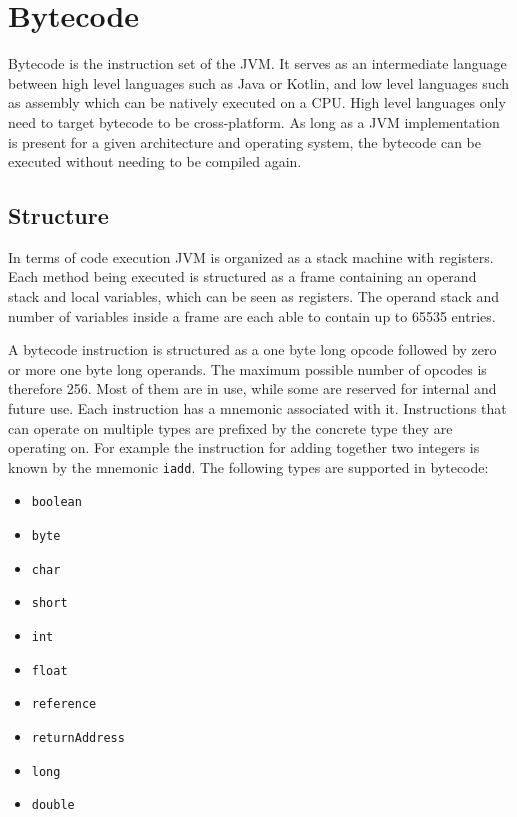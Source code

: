 \section{Bytecode}

Bytecode is the instruction set of the JVM. It serves as an intermediate language between high level languages such as Java or Kotlin, and low level languages such as assembly which can be natively executed on a CPU. High level languages only need to target bytecode to be cross-platform. As long as a JVM implementation is present for a given architecture and operating system, the bytecode can be executed without needing to be compiled again. 

\subsection{Structure}

In terms of code execution JVM is organized as a stack machine with registers. Each method being executed is structured as a frame containing an operand stack and local variables, which can be seen as registers. The operand stack and number of variables inside a frame are each able to contain up to 65535 entries.

A bytecode instruction is structured as a one byte long opcode followed by zero or more one byte long operands. The maximum possible number of opcodes is therefore 256. Most of them are in use, while some are reserved for internal and future use. Each instruction has a mnemonic associated with it. Instructions that can operate on multiple types are prefixed by the concrete type they are operating on. For example the instruction for adding together two integers is known by the mnemonic \texttt{iadd}. The following types are supported in bytecode:

\begin{itemize}
    \item \texttt{boolean}
    \item \texttt{byte}
    \item \texttt{char}
    \item \texttt{short}
    \item \texttt{int}
    \item \texttt{float}
    \item \texttt{reference}
    \item \texttt{returnAddress}
    \item \texttt{long}
    \item \texttt{double}
\end{itemize}

